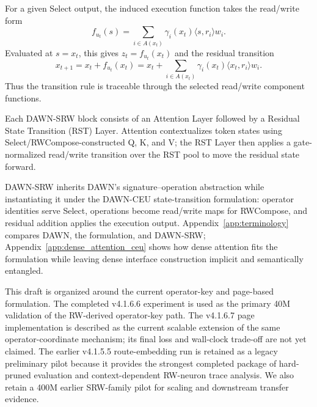 \documentclass{article}
\begin{document}
For a given Select output, the induced execution function takes the read/write form
\begin{equation}
    f_{u_t}(s)=\sum_{i\in A(x_t)} \gamma_i(x_t)\langle s,r_i\rangle w_i .
    \label{eq:intro_srw_induced_execution}
\end{equation}
Evaluated at $s=x_t$, this gives $z_t=f_{u_t}(x_t)$ and the residual transition
\begin{equation}
    x_{t+1}=x_t+f_{u_t}(x_t)
    =x_t+
    \sum_{i\in A(x_t)} \gamma_i(x_t)\langle x_t,r_i\rangle w_i .
    \label{eq:intro_srw_expanded_transition}
\end{equation}
Thus the transition rule is traceable through the selected read/write component functions.


Each DAWN-SRW block consists of an Attention Layer followed by a Residual State Transition (RST) Layer. Attention contextualizes token states using Select/RWCompose-constructed Q, K, and V; the RST Layer then applies a gate-normalized read/write transition over the RST pool to move the residual state forward.


DAWN-SRW inherits DAWN's signature--operation abstraction while instantiating it under the DAWN-CEU state-transition formulation: operator identities serve Select, operations become read/write maps for RWCompose, and residual addition applies the execution output. Appendix~\ref{app:terminology} compares DAWN, the formulation, and DAWN-SRW; Appendix~\ref{app:dense_attention_ceu} shows how dense attention fits the formulation while leaving dense interface construction implicit and semantically entangled.

This draft is organized around the current operator-key and page-based formulation. The completed v4.1.6.6 experiment is used as the primary 40M validation of the RW-derived operator-key path. The v4.1.6.7 page implementation is described as the current scalable extension of the same operator-coordinate mechanism; its final loss and wall-clock trade-off are not yet claimed. The earlier v4.1.5.5 route-embedding run is retained as a legacy preliminary pilot because it provides the strongest completed package of hard-pruned evaluation and context-dependent RW-neuron trace analysis. We also retain a 400M earlier SRW-family pilot for scaling and downstream transfer evidence.
\end{document}

